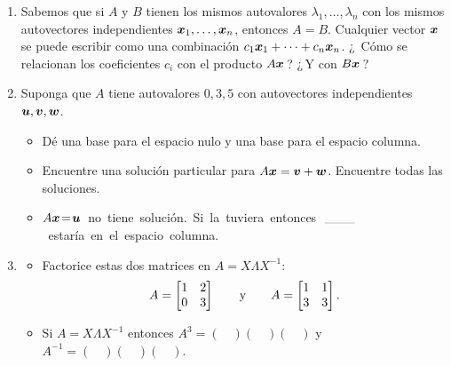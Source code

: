 \documentclass[12pt,a4paper]{article}
\newcommand{\bi}[1]{\hbox{\boldmath$#1$}}
\newcommand\1{\mbox{\,\vrule height-0.8pt depth1.0pt width2pc\,}}
\newcommand\2{\mbox{\,\vrule height-0.8pt depth1.0pt width1pc\,}}
\newcommand{\bv}{\hbox{\boldmath$v$}}
\newcommand\OG{\qquad\hbox{y}\qquad}
\newcommand{\la}{\lambda}
\begin{document}
\begin{enumerate}
\item Sabemos que si $A$ y $B$ tienen los mismos autovalores  $\la_1,\dots,\la_n$ con los mismos autovectores independientes $\bi  x_1,\dots,\bi x_n$, entonces $A=B$. Cualquier vector $\bi  x$ se puede escribir como una combinación $c_1\bi x_1+\cdots+c_n\bi x_n$. ¿\, Cómo se relacionan los coeficientes $c_i$ con el producto $A\bi x$\,? ¿\,Y con $B\bi x$\,?

\item Suponga que $A$ tiene autovalores $0,3,5$ con autovectores independientes $\bi u,\bv,\bi w$.
%
\begin{itemize}
\item[(a)] Dé una base para el espacio nulo y una base para el espacio columna.
\item[(b)] Encuentre una solución particular para $A\bi x=\bv+\bi w$.  Encuentre todas las soluciones.
\item[(c)] $A\bi x\!=\!\bi u$~no~tiene~solución.~Si~la~tuviera~entonces~$\1$~estaría~en~el~espacio~columna.
\end{itemize}

\item
\begin{itemize}
\item[(a)] Factorice estas dos matrices en $A=X\Lambda X^{-1}$:
  \begin{displaymath}
  A=\begin{bmatrix} 1&2\\ 0&3\end{bmatrix} \OG A=
  \begin{bmatrix} 1&1\\ 3&3\end{bmatrix}.
\end{displaymath}
\item[(b)] Si $A=X\Lambda X^{-1}$ entonces $A^3=(\quad )(\quad )(\quad )$
  y $A^{-1}=(\quad )(\quad )(\quad )$.
\end{itemize}



\end{enumerate}
\end{document}

